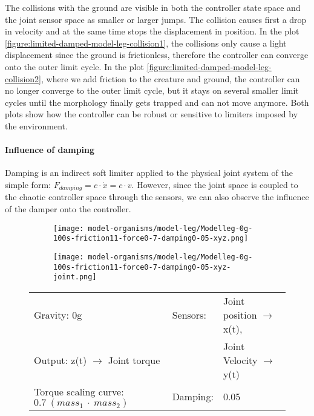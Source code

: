 \documentclass[main]{subfiles}
\begin{document}
The collisions with the ground are visible in both the controller state space and the joint sensor space as smaller or larger jumps. The collision causes first a drop in velocity and at the same time stops the displacement in position. In the plot \ref{figure:limited-damped-model-leg-collision1}, the collisions only cause a light displacement since the ground is frictionless, therefore the controller can converge onto the outer limit cycle. In the plot \ref{figure:limited-damped-model-leg-collision2}, where we add friction to the creature and ground, the controller can no longer converge to the outer limit cycle, but it stays on several smaller limit cycles until the morphology finally gets trapped and can not move anymore. Both plots show how the controller can be robust or sensitive to limiters imposed by the environment.

\paragraph{Influence of damping} Damping is an indirect soft limiter applied to the physical joint system of the simple form: \(F_{damping} = c \cdot \dot{x} = c \cdot v\). However, since the joint space is coupled to the chaotic controller space through the sensors, we can also observe the influence of the damper onto the controller.

\begin{figure}[H]
	\centering
		\begin{subfigure}[c]{0.45\textwidth}
	\texttt{[image: model-organisms/model-leg/Modelleg-0g-100s-friction11-force0-7-damping0-05-xyz.png]}
		\end{subfigure}
	\begin{subfigure}[c]{0.45\textwidth}
	\texttt{[image: model-organisms/model-leg/Modelleg-0g-100s-friction11-force0-7-damping0-05-xyz-joint.png]}
		\end{subfigure}
	\caption[Limited chaotic controller controlling model leg]{}
	\begin{tabular}{l|ll}
	\hline 
	Gravity: 0g  & Sensors: & Joint position \(\rightarrow\) x(t),\\
	 Output: z(t) \(\rightarrow\) Joint torque & & Joint Velocity \(\rightarrow\) y(t) \\
	  Torque scaling curve: \(0.7~(mass_1~\cdot~mass_2)\) & Damping: & 0.05 \\
	  \hline
	\end{tabular}

	\label{figure:limited-damped-model-leg-damping1}
\end{figure}
\end{document}
